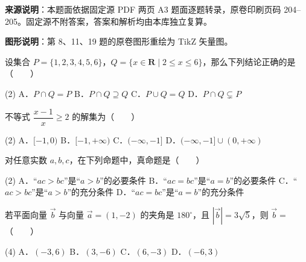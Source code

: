 

\begin{gktip}
\textbf{来源说明}：本题面依据固定源 PDF 两页 A3 题面逐题转录，原卷印刷页码 204–205。固定源不附答案，答案和解析均由本库独立复算。

\textbf{图形说明}：第 8、11、19 题的原卷图形重绘为 TikZ 矢量图。
\end{gktip}


\begin{question}
设集合 $P = \{1, 2, 3, 4, 5, 6\}$，$Q = \{x \in \mathbf{R} \mid 2 \le x \le 6\}$，那么下列结论正确的是\mbox{（　　）}

\begin{gkopts}(2)
\task A．$P \cap Q = P$
\task B．$P \cap Q \supseteq Q$
\task C．$P \cup Q = Q$
\task D．$P \cap Q \subsetneq P$
\end{gkopts}

\end{question}
\begin{question}
不等式 $\dfrac{x-1}{x} \ge 2$ 的解集为\mbox{（　　）}

\begin{gkopts}(2)
\task A．$[-1, 0)$
\task B．$[-1, +\infty)$
\task C．$(-\infty, -1]$
\task D．$(-\infty, -1] \cup (0, +\infty)$
\end{gkopts}

\end{question}
\begin{question}
对任意实数 $a, b, c$，在下列命题中，真命题是\mbox{（　　）}

\begin{gkopts}(2)
\task A．“$ac > bc$”是“$a > b$”的必要条件
\task B．“$ac = bc$”是“$a = b$”的必要条件
\task C．“$ac > bc$”是“$a > b$”的充分条件
\task D．“$ac = bc$”是“$a = b$”的充分条件
\end{gkopts}

\end{question}
\begin{question}
若平面向量 $\vec{b}$ 与向量 $\vec{a} = (1, -2)$ 的夹角是 $180^\circ$，且 $|\vec{b}| = 3\sqrt{5}$，则 $\vec{b} =$\mbox{（　　）}

\begin{gkopts}(4)
\task A．$(-3, 6)$
\task B．$(3, -6)$
\task C．$(6, -3)$
\task D．$(-6, 3)$
\end{gkopts}

\end{question}

